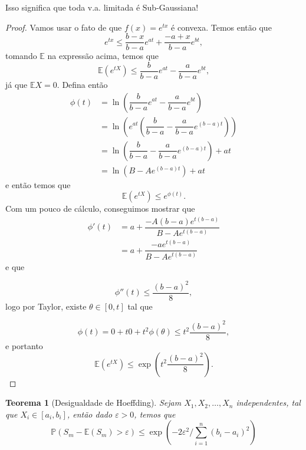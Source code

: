 \documentclass[12pt,a4paper,oneside]{book}
\newtheorem{theorem}{Teorema}[section]
\theoremstyle{definition}
\theoremstyle{remark}
\numberwithin{equation}{section}
\newcommand{\e}{\varepsilon}
\newcommand{\E}{\mathbb{E}}
\newcommand{\pr}{\mathbb{P}}
\begin{document}
\begin{tcolorbox}[colback = yellow!60]
Isso significa que toda v.a. limitada é Sub-Gaussiana!
\end{tcolorbox}


\begin{proof}
Vamos usar o fato de que $f(x)=e^{tx}$ é convexa. Temos então que 
$$e^{tx}\leq\dfrac{b-x}{b-a}e^{at}+\dfrac{-a+x}{b-a}e^{bt}, $$
tomando $\E$ na expressão acima, temos que
$$\E(e^{tX})\leq\dfrac{b}{b-a}e^{at}-\dfrac{a}{b-a}e^{bt},  $$
já que $\E X=0.$ Defina então 
\begin{align*}
\phi(t) &= \ln\left(\dfrac{b}{b-a}e^{at}-\dfrac{a}{b-a}e^{bt}\right)\\
 &= \ln\left(e^{at}\left( \dfrac{b}{b-a}-\dfrac{a}{b-a}e^{(b-a)t}\right)\right)\\
 &= \ln\left(\dfrac{b}{b-a}-\dfrac{a}{b-a}e^{(b-a)t}\right)+at\\
 &= \ln\left(B-Ae^{(b-a)t}\right)+at
\end{align*}
e então temos que
$$\E(e^{tX})\leq e^{\phi(t)}. $$
Com um pouco de cálculo, conseguimos mostrar que 
\begin{align*}
\phi'(t) &= a + \dfrac{-A(b-a)e^{t(b-a)}}{B-Ae^{t(b-a)}}\\
		 &= a + \dfrac{-ae^{t(b-a)}}{B-Ae^{t(b-a)}} 
\end{align*}
e que

$$\phi''(t)\leq \dfrac{(b-a)^2}{8}, $$logo por Taylor, existe $\theta\in[0,t]$ tal que

$$\phi(t) = 0+t0+t^2\phi(\theta)\leq t^2\dfrac{(b-a)^2}{8},  $$
e portanto
$$\E(e^{tX})\leq  \exp\left(t^2\dfrac{(b-a)^2}{8}\right).$$
\end{proof}


\begin{theorem}[Desigualdade de Hoeffding] \label{des-hoeff}Sejam $X_1,X_2,\dots,X_n$ independentes, tal que $X_i\in[a_i,b_i]$, então dado $\e>0$, temos que
$$\pr(S_m -\E(S_m)>\e)\leq \exp({-2\e^2/\sum_{i=1}^n(b_i-a_i)^2}) $$
\end{theorem}
\end{document}

